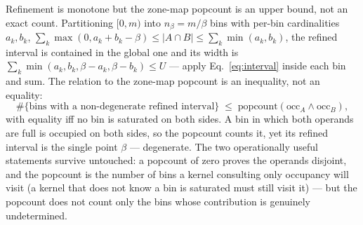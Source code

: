 Refinement is monotone but the zone-map popcount is an upper bound, not an exact count.
Partitioning $[0,m)$ into $n_\beta=m/\beta$ bins with per-bin cardinalities $a_k,b_k$,
$\sum_k\max(0,a_k+b_k-\beta)\le|A\cap B|\le\sum_k\min(a_k,b_k)$, the refined interval is contained in
the global one and its width is $\sum_k\min(a_k,b_k,\beta-a_k,\beta-b_k)\le U$ --- apply
Eq.~\eqref{eq:interval} inside each bin and sum. The relation to the zone-map popcount is an
inequality, not an equality:
\begin{equation}
\#\{\text{bins with a non-degenerate refined interval}\} \;\le\; \mathrm{popcount}(\mathrm{occ}_A\wedge\mathrm{occ}_B),
\label{eq:s3-p11}
\end{equation}
with equality iff no bin is saturated on both sides. A bin in which both operands are full is occupied
on both sides, so the popcount counts it, yet its refined interval is the single point $\beta$ ---
degenerate. The two operationally useful statements survive untouched: a popcount of zero proves the
operands disjoint, and the popcount is the number of bins a kernel consulting only occupancy will
visit (a kernel that does not know a bin is saturated must still visit it) --- but the popcount does
not count only the bins whose contribution is genuinely undetermined.

